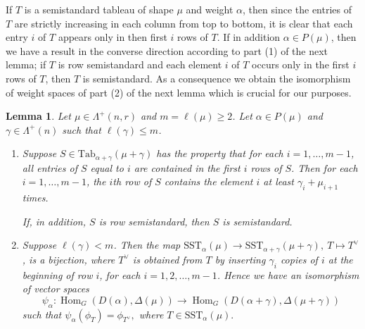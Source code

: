 \documentclass[11pt]{article}
\newtheorem{lemma}[theo]{Lemma}
\theoremstyle{definition}
\numberwithin{equation}{section}
\newcommand{\al}{\alpha}
\newcommand{\La}{\Lambda}
\DeclareMathOperator{\Hom}{Hom}
\numberwithin{equation}{section}
\begin{document}
If $T$ is a semistandard tableau of shape $\mu$ and weight $\alpha$, then since the entries of $T$ are strictly increasing in each column from top to bottom, it is clear that each entry $i$ of $T$ appears only in then first $i$ rows of $T$. If in addition $\alpha \in P(\mu)$, then we have a result in the converse direction according to part (1) of the next lemma; if $T$ is row semistandard and each element $i$ of $T$ occurs only in the first $i$ rows of $T$, then $T$ is semistandard.  As a consequence we obtain the isomorphism of weight spaces of part (2) of the next lemma which is crucial for our purposes.
	\begin{lemma}\label{lem12}Let $\mu\in \La^+(n,r)$ and $m=\ell(\mu) \ge 2$. Let $\al \in P(\mu)$ and $\gamma \in \La^{+}(n)$ such that $\ell(\gamma) \le m$.
	\begin{enumerate}	
	\item  Suppose $S \in \mathrm{Tab}_{\al+\gamma}(\mu+\gamma)$ has the property that for each $i=1,\dots,m-1$, all entries of $S$ equal to $i$ are contained in the first $i$ rows of $S$. Then for each $i=1,\dots,m-1$, the $i$th row of $S$ contains the element $i$ at least $\gamma_i+\mu_{i+1}$ times.
		
			If, in addition, $S$ is row semistandard, then $S$ is semistandard.
			
			\item Suppose $\ell(\gamma) < m$. Then the map $\mathrm{SST}_{\al}(\mu) \to \mathrm{SST}_{\al+\gamma}(\mu+\gamma), \ T \mapsto T^{\vee}$, is a bijection, where $T^{\vee}$ is obtained from $T$ by inserting $\gamma_i$ copies of $i$ at the beginning of row $i$, for each $i=1,2,\dots,m-1$. Hence we have an isomorphism of vector spaces \[\psi_{\al}: \Hom_G(D(\al),\Delta(\mu)) \to \Hom_{G}(D(\al+\gamma),\Delta(\mu+\gamma))\] such that $\psi_{\al}(\phi_T)=\phi_{T^{\vee}},$ where $T \in \mathrm{SST}_{\al}(\mu).$ \end{enumerate}	\end{lemma}
\end{document}
